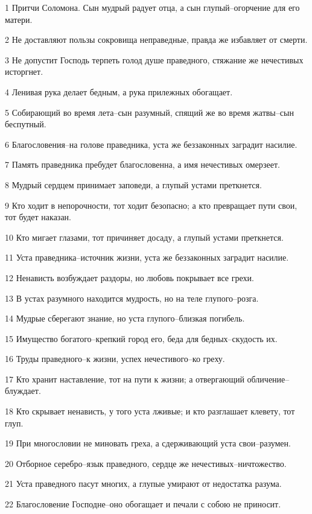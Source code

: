 \par 1 Притчи Соломона. Сын мудрый радует отца, а сын глупый--огорчение для его матери.
\par 2 Не доставляют пользы сокровища неправедные, правда же избавляет от смерти.
\par 3 Не допустит Господь терпеть голод душе праведного, стяжание же нечестивых исторгнет.
\par 4 Ленивая рука делает бедным, а рука прилежных обогащает.
\par 5 Собирающий во время лета--сын разумный, спящий же во время жатвы--сын беспутный.
\par 6 Благословения--на голове праведника, уста же беззаконных заградит насилие.
\par 7 Память праведника пребудет благословенна, а имя нечестивых омерзеет.
\par 8 Мудрый сердцем принимает заповеди, а глупый устами преткнется.
\par 9 Кто ходит в непорочности, тот ходит безопасно; а кто превращает пути свои, тот будет наказан.
\par 10 Кто мигает глазами, тот причиняет досаду, а глупый устами преткнется.
\par 11 Уста праведника--источник жизни, уста же беззаконных заградит насилие.
\par 12 Ненависть возбуждает раздоры, но любовь покрывает все грехи.
\par 13 В устах разумного находится мудрость, но на теле глупого--розга.
\par 14 Мудрые сберегают знание, но уста глупого--близкая погибель.
\par 15 Имущество богатого--крепкий город его, беда для бедных--скудость их.
\par 16 Труды праведного--к жизни, успех нечестивого--ко греху.
\par 17 Кто хранит наставление, тот на пути к жизни; а отвергающий обличение--блуждает.
\par 18 Кто скрывает ненависть, у того уста лживые; и кто разглашает клевету, тот глуп.
\par 19 При многословии не миновать греха, а сдерживающий уста свои--разумен.
\par 20 Отборное серебро--язык праведного, сердце же нечестивых--ничтожество.
\par 21 Уста праведного пасут многих, а глупые умирают от недостатка разума.
\par 22 Благословение Господне--оно обогащает и печали с собою не приносит.
